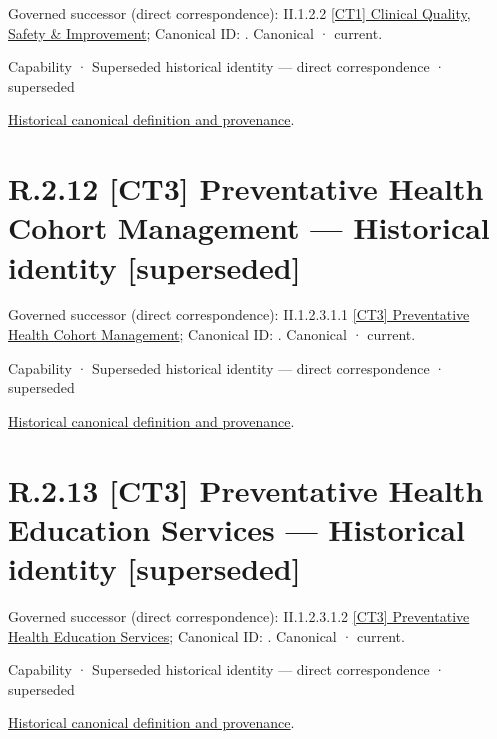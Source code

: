{\small Governed successor (direct correspondence): II.1.2.2 \hyperref[element:63837bf848774572a06b935af95581a2]{[CT1] Clinical Quality, Safety \& Improvement}; Canonical ID: \texttt{}. Canonical · current.}\par
\label{element:b967c383dbcd4c24abe6a83ea5e79e00}
{\small Capability · Superseded historical identity — direct correspondence · superseded}\par
\href{../../../../continuum/strategy/capability/b967c383dbcd4c24abe6a83ea5e79e00.md}{Historical canonical definition and provenance}.\par
\section*{R.2.12 [CT3] Preventative Health Cohort Management — Historical identity [superseded]}
\label{navigation:R.2.12}

{\small Governed successor (direct correspondence): II.1.2.3.1.1 \hyperref[element:97625bb28e5745d5994e1bffd4037188]{[CT3] Preventative Health Cohort Management}; Canonical ID: \texttt{}. Canonical · current.}\par
\label{element:fef479f0fd5048b19b2aec770f0233fe}
{\small Capability · Superseded historical identity — direct correspondence · superseded}\par
\href{../../../../continuum/strategy/capability/fef479f0fd5048b19b2aec770f0233fe.md}{Historical canonical definition and provenance}.\par
\section*{R.2.13 [CT3] Preventative Health Education Services — Historical identity [superseded]}
\label{navigation:R.2.13}

{\small Governed successor (direct correspondence): II.1.2.3.1.2 \hyperref[element:7541d9b3b65d47d286dabdc093cb0eed]{[CT3] Preventative Health Education Services}; Canonical ID: \texttt{}. Canonical · current.}\par
\label{element:dbe10959237f405caeadef2a5748303a}
{\small Capability · Superseded historical identity — direct correspondence · superseded}\par
\href{../../../../continuum/strategy/capability/dbe10959237f405caeadef2a5748303a.md}{Historical canonical definition and provenance}.\par
